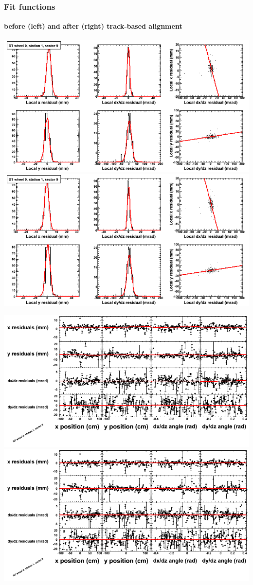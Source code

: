 \documentclass[compress]{beamer}
\begin{document}
\begin{frame}
\frametitle{Fit functions}
\framesubtitle{before (left) and after (right) track-based alignment}
\includegraphics[width=0.5\linewidth]{fitfunctions_re01/MBwhCst1sec09_bellcurves.png} \includegraphics[width=0.5\linewidth]{fitfunctions_re05/MBwhCst1sec09_bellcurves.png}

\includegraphics[width=0.5\linewidth]{fitfunctions_re01/MBwhCst1sec09_polynomials.png} \includegraphics[width=0.5\linewidth]{fitfunctions_re05/MBwhCst1sec09_polynomials.png}
\end{frame}
\end{document}
